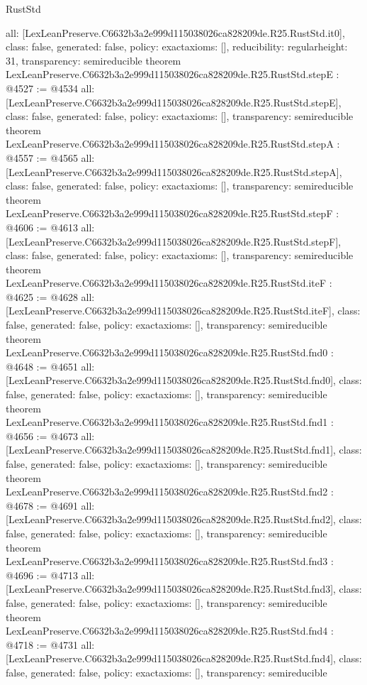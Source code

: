 \begin{lexlean}{RustStd}
\begin{coremodule}
{  all: [LexLeanPreserve.C6632b3a2e999d115038026ca828209de.R25.RustStd.it0],
  class: false,
  generated: false,
  policy: exact{axioms: []},
  reducibility: regular{height: 31},
  transparency: semireducible
}
theorem LexLeanPreserve.C6632b3a2e999d115038026ca828209de.R25.RustStd.stepE : @4527 := @4534 {
  all: [LexLeanPreserve.C6632b3a2e999d115038026ca828209de.R25.RustStd.stepE],
  class: false,
  generated: false,
  policy: exact{axioms: []},
  transparency: semireducible
}
theorem LexLeanPreserve.C6632b3a2e999d115038026ca828209de.R25.RustStd.stepA : @4557 := @4565 {
  all: [LexLeanPreserve.C6632b3a2e999d115038026ca828209de.R25.RustStd.stepA],
  class: false,
  generated: false,
  policy: exact{axioms: []},
  transparency: semireducible
}
theorem LexLeanPreserve.C6632b3a2e999d115038026ca828209de.R25.RustStd.stepF : @4606 := @4613 {
  all: [LexLeanPreserve.C6632b3a2e999d115038026ca828209de.R25.RustStd.stepF],
  class: false,
  generated: false,
  policy: exact{axioms: []},
  transparency: semireducible
}
theorem LexLeanPreserve.C6632b3a2e999d115038026ca828209de.R25.RustStd.iteF : @4625 := @4628 {
  all: [LexLeanPreserve.C6632b3a2e999d115038026ca828209de.R25.RustStd.iteF],
  class: false,
  generated: false,
  policy: exact{axioms: []},
  transparency: semireducible
}
theorem LexLeanPreserve.C6632b3a2e999d115038026ca828209de.R25.RustStd.fnd0 : @4648 := @4651 {
  all: [LexLeanPreserve.C6632b3a2e999d115038026ca828209de.R25.RustStd.fnd0],
  class: false,
  generated: false,
  policy: exact{axioms: []},
  transparency: semireducible
}
theorem LexLeanPreserve.C6632b3a2e999d115038026ca828209de.R25.RustStd.fnd1 : @4656 := @4673 {
  all: [LexLeanPreserve.C6632b3a2e999d115038026ca828209de.R25.RustStd.fnd1],
  class: false,
  generated: false,
  policy: exact{axioms: []},
  transparency: semireducible
}
theorem LexLeanPreserve.C6632b3a2e999d115038026ca828209de.R25.RustStd.fnd2 : @4678 := @4691 {
  all: [LexLeanPreserve.C6632b3a2e999d115038026ca828209de.R25.RustStd.fnd2],
  class: false,
  generated: false,
  policy: exact{axioms: []},
  transparency: semireducible
}
theorem LexLeanPreserve.C6632b3a2e999d115038026ca828209de.R25.RustStd.fnd3 : @4696 := @4713 {
  all: [LexLeanPreserve.C6632b3a2e999d115038026ca828209de.R25.RustStd.fnd3],
  class: false,
  generated: false,
  policy: exact{axioms: []},
  transparency: semireducible
}
theorem LexLeanPreserve.C6632b3a2e999d115038026ca828209de.R25.RustStd.fnd4 : @4718 := @4731 {
  all: [LexLeanPreserve.C6632b3a2e999d115038026ca828209de.R25.RustStd.fnd4],
  class: false,
  generated: false,
  policy: exact{axioms: []},
  transparency: semireducible
}
\end{coremodule}
\end{lexlean}
